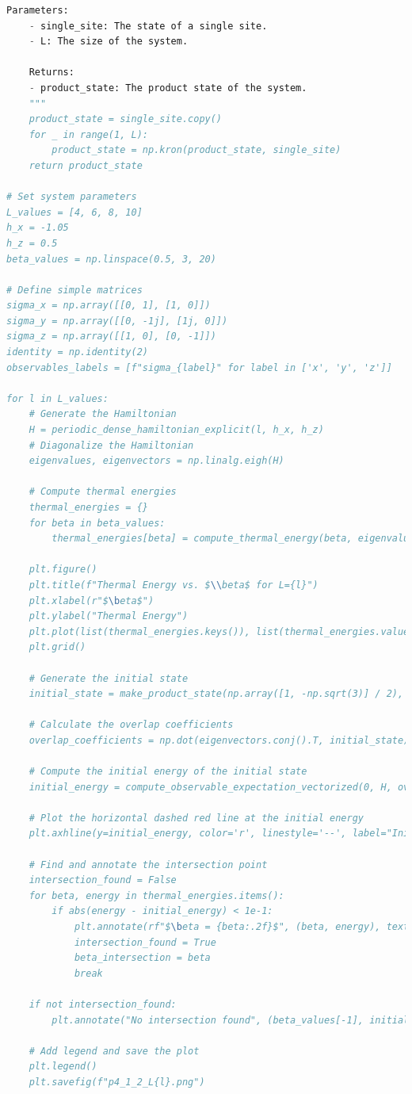 \documentclass[12pt]{article}
\begin{document}
\begin{lstlisting}[language=Python]
    Parameters:
    - single_site: The state of a single site.
    - L: The size of the system.
    
    Returns:
    - product_state: The product state of the system.
    """
    product_state = single_site.copy()
    for _ in range(1, L):
        product_state = np.kron(product_state, single_site)
    return product_state

# Set system parameters
L_values = [4, 6, 8, 10]
h_x = -1.05
h_z = 0.5
beta_values = np.linspace(0.5, 3, 20)

# Define simple matrices
sigma_x = np.array([[0, 1], [1, 0]])
sigma_y = np.array([[0, -1j], [1j, 0]])
sigma_z = np.array([[1, 0], [0, -1]])
identity = np.identity(2)
observables_labels = [f"sigma_{label}" for label in ['x', 'y', 'z']]

for l in L_values:
    # Generate the Hamiltonian
    H = periodic_dense_hamiltonian_explicit(l, h_x, h_z)
    # Diagonalize the Hamiltonian
    eigenvalues, eigenvectors = np.linalg.eigh(H)

    # Compute thermal energies
    thermal_energies = {}
    for beta in beta_values:
        thermal_energies[beta] = compute_thermal_energy(beta, eigenvalues)

    plt.figure()
    plt.title(f"Thermal Energy vs. $\\beta$ for L={l}")
    plt.xlabel(r"$\beta$")
    plt.ylabel("Thermal Energy")
    plt.plot(list(thermal_energies.keys()), list(thermal_energies.values()))
    plt.grid()

    # Generate the initial state
    initial_state = make_product_state(np.array([1, -np.sqrt(3)] / 2), l)
    
    # Calculate the overlap coefficients
    overlap_coefficients = np.dot(eigenvectors.conj().T, initial_state)

    # Compute the initial energy of the initial state
    initial_energy = compute_observable_expectation_vectorized(0, H, overlap_coefficients, eigenvalues, eigenvectors)

    # Plot the horizontal dashed red line at the initial energy
    plt.axhline(y=initial_energy, color='r', linestyle='--', label="Initial Energy")

    # Find and annotate the intersection point
    intersection_found = False
    for beta, energy in thermal_energies.items():
        if abs(energy - initial_energy) < 1e-1:
            plt.annotate(rf"$\beta = {beta:.2f}$", (beta, energy), textcoords="offset points", xytext=(0, 10), ha='center', color='red')
            intersection_found = True
            beta_intersection = beta
            break

    if not intersection_found:
        plt.annotate("No intersection found", (beta_values[-1], initial_energy), textcoords="offset points", xytext=(-40, -10), ha='center', color='red')

    # Add legend and save the plot
    plt.legend()
    plt.savefig(f"p4_1_2_L{l}.png")
\end{lstlisting}
\end{document}
